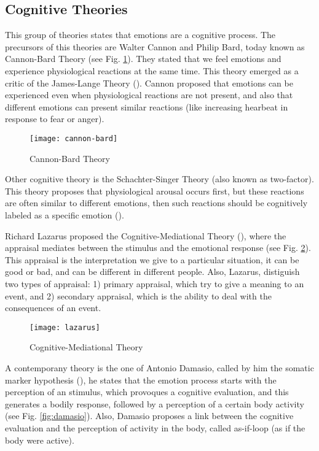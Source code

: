 
\subsection{Cognitive Theories }

This group of theories states that emotions are a cognitive process. The precursors of this theories are Walter Cannon and Philip Bard, today known as Cannon-Bard Theory (see Fig.  \ref{fig:cannon-bard}). They stated that we feel emotions and experience physiological reactions at the same time. This theory emerged as a critic of the James-Lange Theory (\cite{cannon1927james}).
Cannon proposed that emotions can be experienced even when physiological reactions are not present, and also that different emotions can present similar reactions (like increasing hearbeat in response to fear or anger).

\begin{figure}[]
\centering
	\texttt{[image: cannon-bard]}
    \caption{Cannon-Bard Theory}
\label{fig:cannon-bard}
\end{figure}

Other cognitive theory is the Schachter-Singer Theory (also known as two-factor). This theory proposes that physiological arousal occurs first, but these reactions are often similar to different emotions, then such reactions should be cognitively labeled as a specific emotion (\cite{schachter1962cognitive}).

Richard Lazarus proposed the Cognitive-Mediational Theory (\cite{lazarus1991emotion}), where the appraisal mediates between the stimulus and the emotional response  (see Fig. \ref{fig:lazarus}). This appraisal is the interpretation we give to a particular situation, it can be good or bad, and can be different in different people. Also, Lazarus, distiguish two types of appraisal: 1) primary appraisal, which try to give a meaning to an event, and 2) secondary appraisal, which is the ability to deal with the consequences of an event.

\begin{figure}[]
\centering
	\texttt{[image: lazarus]}
    \caption{Cognitive-Mediational Theory}
\label{fig:lazarus}
\end{figure}

A contemporany theory is the one of Antonio Damasio, called by him the somatic marker hypothesis (\cite{damasio1996somatic}), he states that the emotion process starts with the perception of an stimulus, which provoques a cognitive evaluation, and this generates a bodily response, followed by a perception of a certain body activity (see Fig. \ref{fig:damasio}). Also, Damasio proposes a link between the cognitive evaluation and the perception of activity in the body, called as-if-loop (as if the body were active).

